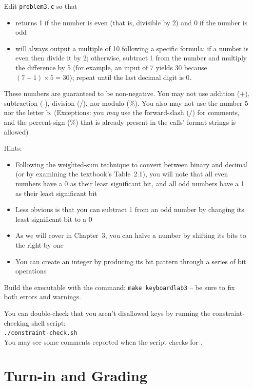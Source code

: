Edit \texttt{problem3.c} so that
\begin{itemize}
\item {} returns 1 if the number is even (that is,
    divisible by 2) and 0 if the number is odd
\item {} will always output a multiple of
    10 following a specific formula: if a number is even then divide it by
    2; otherwise, subtract 1 from the number and multiply the difference
    by 5 (for example, an input of 7 yields 30 because $(7-1) \times 5 = 30$);
    repeat until the last decimal digit is 0.
\end{itemize}
These numbers are guaranteed to be non-negative. You may not use addition (+),
subtraction (-), division (/), nor modulo (\%). You also may not use the
number 5 nor the letter b. (Exceptions: you \textit{may} use the forward-slash
(/) for comments, and the percent-sign (\%) that is already present in the
 calls' format strings is allowed)

Hints:
\begin{itemize}
\item Following the weighted-sum technique to convert between binary and
    decimal (or by examining the textbook's Table~2.1), you will note that all
    even numbers have a 0 as their least significant bit, and all odd numbers
    have a 1 as their least significant bit
\item Less obvious is that you can subtract 1 from an odd number by changing
    its least significant bit to a 0
\item As we will cover in Chapter~3, you can halve a number by shifting its
    bits to the right by one
\item You can create an integer by producing its bit pattern through a series
    of bit operations
\end{itemize}

Build the executable with the command: \texttt{make keyboardlab3} -- be sure to
fix both errors and warnings.

You can double-check that you aren't disallowed keys by running the
constraint-checking shell script: \\
\texttt{./constraint-check.sh} \\
You may see some comments reported when the script checks for
\textquotesingle *\textquotesingle.


\section*{Turn-in and Grading}

